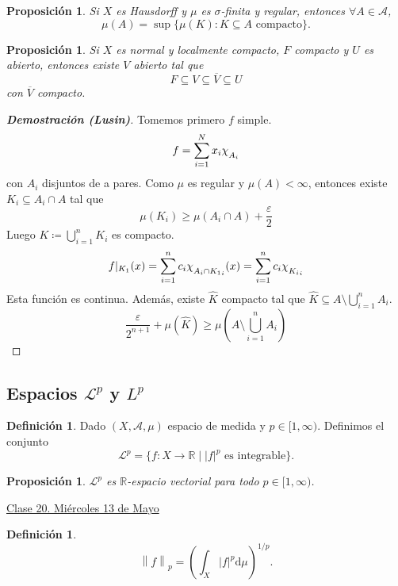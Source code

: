 \documentclass{article}
\newtheorem{proposition}[theorem]{Proposición}
\theoremstyle{definition}
\newtheorem{definition}[theorem]{Definición}
\theoremstyle{remark}
\numberwithin{equation}{section}
\newcommand{\R}{\mathbb{R}}
\newcommand{\Acal}{\mathcal{A}}
\newcommand{\Lcal}{\mathcal{L}}
\renewcommand{\d}{\mathrm{d}}
\newcommand{\e}{\varepsilon}
\newcommand{\oo}{\infty}
\renewcommand{\bar}{\overline}
\renewcommand{\hat}{\widehat}
\newcommand{\abs}[1]{\left| #1 \right|}
\newcommand{\norm}[1]{\left\lVert #1 \right\rVert}
\newcommand{\br}[1]{\left( #1 \right)}
\newcommand{\Chi}[1]{\chi_{\raisebox{-.5ex}{$\scriptstyle #1$}}}
\newcommand{\fecha}[1]{\begin{flushright} \underline{#1} \end{flushright}}
\newcommand{\dem}[1]{\textbf{Demostración (#1)}}
\begin{document}
\begin{proposition}
  Si $X$ es Hausdorff y $\mu$ es $\sigma$-finita y regular, entonces $\forall A \in \Acal$, 
  \[ \mu(A) = \sup\{\mu(K) \colon K \subseteq A \text{ compacto}\}. \]
\end{proposition}

\begin{proposition}
  Si $X$ es normal y localmente compacto, $F$ compacto y $U$ es abierto, entonces existe $V$ abierto tal que 
  \[ F \subseteq V \subseteq \bar V \subseteq U \]
  con $\bar V$ compacto.
\end{proposition}

\newcommand{\simple}[4]{\sum_{#1 = 1}^{#2} {#3}_{#1} \Chi{{#4}_{#1}}}
\begin{proof}
  [\dem{Lusin}]
  Tomemos primero $f$ simple. 
  \[ f = \sum_{i=1}^N x_i \Chi{A_i} \]
  con $A_i$ disjuntos de a pares. Como $\mu$ es regular y $\mu(A) < \oo$, entonces existe $K_i \subseteq A_i \cap A$ tal que 
  \[ \mu(K_i) \geq \mu(A_i \cap A) + \frac\e2 \]
  Luego $K \coloneqq \bigcup_{i=1}^n K_i$ es compacto. 
  \[ f|_{K_1}(x) = \simple{i}{n}{c}{A_i \cap K_1}(x) = \simple{i}{n}{c}{K_i} \]
  Esta función es continua. Además, existe $\hat K$ compacto tal que $\hat K \subseteq A \setminus \bigcup_{i=1}^n A_i$. 
  \[ \frac{\e}{2^{n+1}} + \mu(\hat K) \geq \mu\br{A \setminus \bigcup_{i=1}^n A_i} \]
\end{proof}


\subsection{Espacios \texorpdfstring{$\mathcal{L}^p$}{LLp} y \texorpdfstring{$L^p$}{Lp}} %

\begin{definition}
  Dado $(X,\Acal,\mu)$ espacio de medida y $p \in [1,\oo)$. Definimos el conjunto 
  \[ \Lcal^p = \{f \colon X \to \R \mid \abs{f}^p \text{ es integrable}\}. \]
\end{definition}

\begin{proposition}
  $\Lcal^p$ es $\R$-espacio vectorial para todo $p \in [1,\oo)$.
\end{proposition}

\fecha{Clase 20. Miércoles 13 de Mayo}

\begin{definition}
  \[ \norm{f}_p = \br{\int_X \abs{f}^p \d\mu}^{1/p}. \]
\end{definition}
\end{document}
